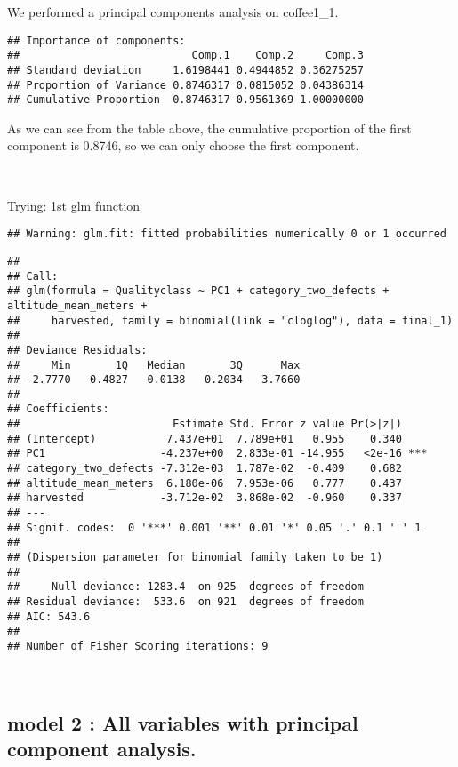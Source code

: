 \documentclass[
]{article}
\begin{document}
We performed a principal components analysis on coffee1\_1.

\begin{verbatim}
## Importance of components:
##                           Comp.1    Comp.2     Comp.3
## Standard deviation     1.6198441 0.4944852 0.36275257
## Proportion of Variance 0.8746317 0.0815052 0.04386314
## Cumulative Proportion  0.8746317 0.9561369 1.00000000
\end{verbatim}

As we can see from the table above, the cumulative proportion of the
first component is 0.8746, so we can only choose the first component.

~

Trying: 1st glm function

\begin{verbatim}
## Warning: glm.fit: fitted probabilities numerically 0 or 1 occurred
\end{verbatim}

\begin{verbatim}
## 
## Call:
## glm(formula = Qualityclass ~ PC1 + category_two_defects + altitude_mean_meters + 
##     harvested, family = binomial(link = "cloglog"), data = final_1)
## 
## Deviance Residuals: 
##     Min       1Q   Median       3Q      Max  
## -2.7770  -0.4827  -0.0138   0.2034   3.7660  
## 
## Coefficients:
##                        Estimate Std. Error z value Pr(>|z|)    
## (Intercept)           7.437e+01  7.789e+01   0.955    0.340    
## PC1                  -4.237e+00  2.833e-01 -14.955   <2e-16 ***
## category_two_defects -7.312e-03  1.787e-02  -0.409    0.682    
## altitude_mean_meters  6.180e-06  7.953e-06   0.777    0.437    
## harvested            -3.712e-02  3.868e-02  -0.960    0.337    
## ---
## Signif. codes:  0 '***' 0.001 '**' 0.01 '*' 0.05 '.' 0.1 ' ' 1
## 
## (Dispersion parameter for binomial family taken to be 1)
## 
##     Null deviance: 1283.4  on 925  degrees of freedom
## Residual deviance:  533.6  on 921  degrees of freedom
## AIC: 543.6
## 
## Number of Fisher Scoring iterations: 9
\end{verbatim}

~

\hypertarget{model-2-all-variables-with-principal-component-analysis.}{%
\subsection{model 2 : All variables with principal component
analysis.}\label{model-2-all-variables-with-principal-component-analysis.}}
\end{document}
